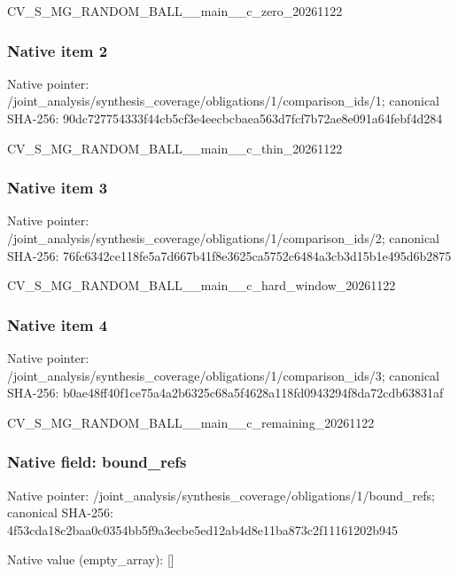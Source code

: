 \documentclass[10pt,a4paper]{article}
\begin{document}
CV\_S\_MG\_RANDOM\_BALL\_\_mai\allowbreak{}n\_\_c\_zero\_20261122


\subsubsection{Native item 2}


Native pointer: /joint\_analysis/synthesi\allowbreak{}s\_coverage/obligations/1\allowbreak{}/comparison\_ids/1; canonical SHA-256: 90dc727754333f44cb5cf3e4\allowbreak{}eecbcbaea563d7fcf7b72ae8\allowbreak{}e091a64febf4d284


CV\_S\_MG\_RANDOM\_BALL\_\_mai\allowbreak{}n\_\_c\_thin\_20261122


\subsubsection{Native item 3}


Native pointer: /joint\_analysis/synthesi\allowbreak{}s\_coverage/obligations/1\allowbreak{}/comparison\_ids/2; canonical SHA-256: 76fc6342ce118fe5a7d667b4\allowbreak{}1f8e3625ca5752c6484a3cb3\allowbreak{}d15b1e495d6b2875


CV\_S\_MG\_RANDOM\_BALL\_\_mai\allowbreak{}n\_\_c\_hard\_window\_2026112\allowbreak{}2


\subsubsection{Native item 4}


Native pointer: /joint\_analysis/synthesi\allowbreak{}s\_coverage/obligations/1\allowbreak{}/comparison\_ids/3; canonical SHA-256: b0ae48ff40f1ce75a4a2b632\allowbreak{}5c68a5f4628a118fd0943294\allowbreak{}f8da72cdb63831af


CV\_S\_MG\_RANDOM\_BALL\_\_mai\allowbreak{}n\_\_c\_remaining\_20261122


\subsubsection{Native field: bound\_refs}


Native pointer: /joint\_analysis/synthesi\allowbreak{}s\_coverage/obligations/1\allowbreak{}/bound\_refs; canonical SHA-256: 4f53cda18c2baa0c0354bb5f\allowbreak{}9a3ecbe5ed12ab4d8e11ba87\allowbreak{}3c2f11161202b945



Native value (empty\_array): []
\end{document}
